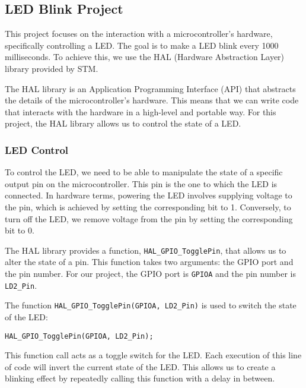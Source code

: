 \subsection{LED Blink Project}

This project focuses on the interaction with a microcontroller's hardware, specifically controlling a LED. The goal is to make a LED blink every 1000 milliseconds. To achieve this, we use the HAL (Hardware Abstraction Layer) library provided by STM.

The HAL library is an Application Programming Interface (API) that abstracts the details of the microcontroller's hardware. This means that we can write code that interacts with the hardware in a high-level and portable way. For this project, the HAL library allows us to control the state of a LED.

\subsubsection{LED Control}

To control the LED, we need to be able to manipulate the state of a specific output pin on the microcontroller. This pin is the one to which the LED is connected. In hardware terms, powering the LED involves supplying voltage to the pin, which is achieved by setting the corresponding bit to 1. Conversely, to turn off the LED, we remove voltage from the pin by setting the corresponding bit to 0.

The HAL library provides a function, \texttt{HAL\_GPIO\_TogglePin}, that allows us to alter the state of a pin. This function takes two arguments: the GPIO port and the pin number. For our project, the GPIO port is \texttt{GPIOA} and the pin number is \texttt{LD2\_Pin}.

The function \texttt{HAL\_GPIO\_TogglePin(GPIOA, LD2\_Pin)} is used to switch the state of the LED:

\begin{verbatim}
HAL_GPIO_TogglePin(GPIOA, LD2_Pin);
\end{verbatim}

This function call acts as a toggle switch for the LED. Each execution of this line of code will invert the current state of the LED. This allows us to create a blinking effect by repeatedly calling this function with a delay in between.